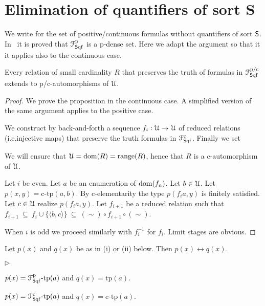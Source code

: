 \documentclass{amsproc}
\newcommand{\mylabel}[1]{{#1}\hfill}
\renewenvironment{itemize}
  {\begin{list}{$\triangleright$}{%
  \setlength{\parskip}{0mm}
  \setlength{\topsep}{.4\baselineskip}
  \setlength{\rightmargin}{0mm}
  \setlength{\listparindent}{0mm}
  \setlength{\itemindent}{0mm}
  \setlength{\labelwidth}{3ex}
  \setlength{\itemsep}{.2\baselineskip}
  \setlength{\parsep}{.2\baselineskip}
  \setlength{\partopsep}{0mm}
  \setlength{\labelsep}{1ex}
  \setlength{\leftmargin}{\labelwidth+\labelsep}
  \let\makelabel\mylabel}}{%
\end{list}}
\renewcommand*{\emph}[1]{%
   \smash{\tikz[baseline]\node[rectangle, fill=teal!25, rounded corners, inner xsep=0.5ex, inner ysep=0.2ex, anchor=base, minimum height = 2.7ex]{\strut #1};}}
\begin{document}
{%
\section{Elimination of quantifiers of sort \textsf{S}}\label{cIelimination}

We write \emph{${\EuScript F}^{\rm p/c}_{{\sf S}{\rm qf}}$} for the set of positive/continuous formulas without quantifiers of sort ${\sf S}$.
In~\cite{clcl} it is proved that ${\EuScript F}^{\rm p}_{{\sf S}{\rm qf}}$ is a p-dense set.
Here we adapt the argument so that it it applies also to the continuous case.

\begin{proposition}\label{prop_Iqf_elim}
  Every relation of small cardinality $R$ that preserves the truth of formulas in ${\EuScript F}^{\rm p/c}_{{\sf S}{\rm qf}}$ extends to p/c-automorphisms of ${\EuScript U}$.
\end{proposition}

\begin{proof}
  We prove the proposition in the continuous case.
  A simplified version of the same argument applies to the positive case.

  We construct by back-and-forth a sequence $f_i:{\EuScript U}\rightarrow{\EuScript U}$ of reduced relations (i.e.\@ injective maps) that preserve the truth formulas in ${\EuScript F}^{\rm c}_{{\sf S}{\rm qf}}$.
  Finally we set 
  

  We will ensure that ${\EuScript U}={\rm dom}(R)={\rm range}(R)$, hence that $R$ is a c-automorphism of ${\EuScript U}$.

  Let $i$ be even.
  Let $a$ be an enumeration of ${\rm dom}(f_n)$.
  Let $b\in{\EuScript U}$. 
  Let $p(x,y)=\mbox{c-tp}(a,b)$.
  By c-elementarity the type $p(f_ia,y)$ is finitely satisfied.
  Let $c\in{\EuScript U}$ realize $p(f_ia,y)$.
  Let $f_{i+1}$ be a reduced relation such that $f_{i+1}\ \subseteq\ f_i\cup\{\langle b,c\rangle\}\ \subseteq\ (\sim)\circ f_{i+1}\circ(\sim)$.

  When $i$ is odd we proceed similarly with $f_i^{-1}$ for $f_i$.
  Limit stages are obvious.
\end{proof}

\begin{corollary}\label{corol_cLcomplete}
  Let $p(x)$ and $q(x)$ be as in (i) or (ii) below.
  Then $p(x)\leftrightarrow q(x)$.
  \begin{itemize}
    \item[i.] $p(x)={\EuScript F}^{\rm p}_{{\sf S}{\rm qf}}\mbox{-tp}(a)$ and $q(x)=\mbox{tp}(a)$.
    \item[ii.] $p(x)={\EuScript F}^{\rm c}_{{\sf S}{\rm qf}}\mbox{-tp}(a)$ and $q(x)=\mbox{c-tp}(a)$.
  \end{itemize}
\end{corollary}

}
\end{document}
